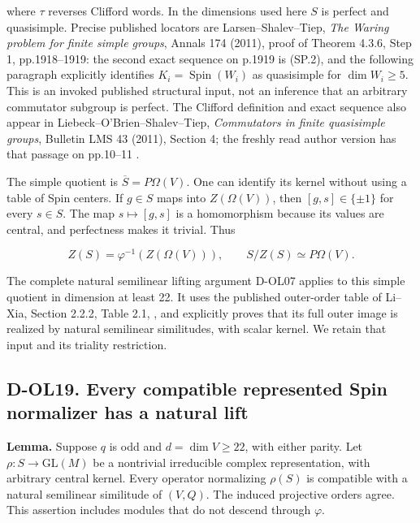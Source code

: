where \(\tau\) reverses Clifford words. In the dimensions used here \(S\) is perfect and quasisimple. Precise published locators are Larsen--Shalev--Tiep, \emph{The Waring problem for finite simple groups}, Annals 174 (2011), proof of Theorem 4.3.6, Step 1, pp.1918--1919: the second exact sequence on p.1919 is (SP.2), and the following paragraph explicitly identifies \(K_i=\operatorname{Spin}(W_i)\) as quasisimple for \(\dim W_i\ge5\). \cite[proof of Theorem~4.3.6, Step~1, pp.~1918--1919]{HOS:LST2011} This is an invoked published structural input, not an inference that an arbitrary commutator subgroup is perfect. The Clifford definition and exact sequence also appear in Liebeck--O'Brien--Shalev--Tiep, \emph{Commutators in finite quasisimple groups}, Bulletin LMS 43 (2011), Section 4; the freshly read author version has that passage on pp.10--11 \cite[Section~4, author pp.~10--11]{SF:LOST2011}.

The simple quotient is \(\overline S=P\Omega(V)\). One can identify its kernel without using a table of Spin centers. If \(g\in S\) maps into \(Z(\Omega(V))\), then \([g,s]\in\{\pm1\}\) for every \(s\in S\). The map \(s\mapsto[g,s]\) is a homomorphism because its values are central, and perfectness makes it trivial. Thus

\[
 Z(S)=\varphi^{-1}(Z(\Omega(V))),\qquad
 S/Z(S)\simeq P\Omega(V).
 \tag{SP.3}
\]

The complete natural semilinear lifting argument D-OL07 applies to this simple quotient in dimension at least 22. It uses the published outer-order table of Li--Xia, Section 2.2.2, Table 2.1, \cite[Section~2.2.2, Table~2.1]{HES:LiXia2022}, and explicitly proves that its full outer image is realized by natural semilinear similitudes, with scalar kernel. We retain that input and its triality restriction.

\subsection{D-OL19. Every compatible represented Spin normalizer has a natural lift}\label{SF-SPIN:d-ol19.-every-compatible-represented-spin-normalizer-has-a-natural-lift}

\textbf{Lemma.} Suppose \(q\) is odd and \(d=\dim V\ge22\), with either parity. Let \(\rho:S\to\mathrm{GL}(M)\) be a nontrivial irreducible complex representation, with arbitrary central kernel. Every operator normalizing \(\rho(S)\) is compatible with a natural semilinear similitude of \((V,Q)\). The induced projective orders agree. This assertion includes modules that do not descend through \(\varphi\).

